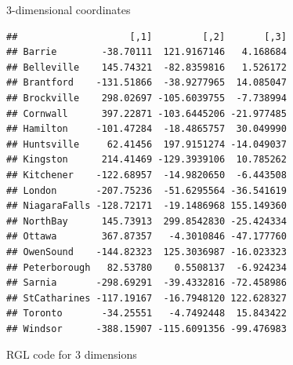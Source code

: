 \begin{frame}[fragile]{3-dimensional coordinates}
  
{\scriptsize
\begin{knitrout}
\color{fgcolor}\begin{kframe}
\begin{alltt}
\hlkwb{=}\hlstd{)}
\end{alltt}
\begin{verbatim}
##                    [,1]         [,2]       [,3]
## Barrie        -38.70111  121.9167146   4.168684
## Belleville    145.74321  -82.8359816   1.526172
## Brantford    -131.51866  -38.9277965  14.085047
## Brockville    298.02697 -105.6039755  -7.738994
## Cornwall      397.22871 -103.6445206 -21.977485
## Hamilton     -101.47284  -18.4865757  30.049990
## Huntsville     62.41456  197.9151274 -14.049037
## Kingston      214.41469 -129.3939106  10.785262
## Kitchener    -122.68957  -14.9820650  -6.443508
## London       -207.75236  -51.6295564 -36.541619
## NiagaraFalls -128.72171  -19.1486968 155.149360
## NorthBay      145.73913  299.8542830 -25.424334
## Ottawa        367.87357   -4.3010846 -47.177760
## OwenSound    -144.82323  125.3036987 -16.023323
## Peterborough   82.53780    0.5508137  -6.924234
## Sarnia       -298.69291  -39.4332816 -72.458986
## StCatharines -117.19167  -16.7948120 122.628327
## Toronto       -34.25551   -4.7492448  15.843422
## Windsor      -388.15907 -115.6091356 -99.476983
\end{verbatim}
\end{kframe}
\end{knitrout}
}
  
\end{frame}

\begin{frame}[fragile]{RGL code for 3 dimensions}
  
\begin{knitrout}
\color{fgcolor}\begin{kframe}
\begin{alltt}
\hlopt{$}
\end{alltt}
\end{kframe}
\end{knitrout}



\end{frame}

